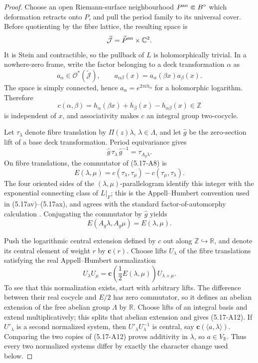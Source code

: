 \begin{proof}
Choose an open Riemann-surface neighbourhood \(P^{\rm an}\Subset B^\circ\)
which deformation retracts onto \(P\), and pull the period family to its
universal cover.  Before quotienting by the fibre lattice, the resulting
space is
\[
 \widetilde{\mathcal J}
 =\widetilde P^{\rm an}\times\mathbb C^2.
\]
It is Stein and contractible, so the pullback of \(L\) is holomorphically
trivial.  In a nowhere-zero frame, write the factor belonging to a deck
transformation \(\alpha\) as
\[
 a_\alpha\in\mathcal O^*(\widetilde{\mathcal J}),
 \qquad
 a_{\alpha\beta}(x)=a_\alpha(\beta x)a_\beta(x).
\tag{5.17-A7}
\]
The space is simply connected, hence \(a_\alpha=e^{2\pi i h_\alpha}\) for
a holomorphic logarithm.  Therefore
\[
 c(\alpha,\beta)
 =h_\alpha(\beta x)+h_\beta(x)-h_{\alpha\beta}(x)\in\mathbb Z
\tag{5.17-A8}
\]
is independent of \(x\), and associativity makes \(c\) an integral group
two-cocycle.

Let \(\tau_\lambda\) denote fibre translation by
\(\Pi(z)\lambda\), \(\lambda\in\Lambda\), and let \(\widehat g\) be the
zero-section lift of a base deck transformation.  Period equivariance gives
\[
 \widehat g\,\tau_\lambda\,\widehat g^{-1}
 =\tau_{A_g\lambda}.
\tag{5.17-A9}
\]
On fibre translations, the commutator of (5.17-A8) is
\[
 E(\lambda,\mu)
 =c(\tau_\lambda,\tau_\mu)-c(\tau_\mu,\tau_\lambda).
\tag{5.17-A10}
\]
The four oriented sides of the \((\lambda,\mu)\)-parallelogram identify
this integer with the exponential connecting class of \(L|_F\); this is
the Appell--Humbert convention used in
(5.17av)--(5.17ax), and agrees with the standard factor-of-automorphy
calculation \cite[Chapter~1, \S2, pp.~5--8, especially
Theorem~2.1, p.~7]{BirkenhakeLange1999}%
\cite[equations~(3.3)--(3.10), pp.~3--7]{SchnellLecture3}.
Conjugating the commutator by \(\widehat g\) yields
\[
 E(A_g\lambda,A_g\mu)=E(\lambda,\mu).
\tag{5.17-A11}
\]

Push the logarithmic central extension defined by \(c\) out along
\(\mathbb Z\hookrightarrow\mathbb R\), and denote its central element of
weight \(r\) by \(\mathbf c(r)\).  Choose lifts \(U_\lambda\) of the fibre
translations satisfying the real Appell--Humbert normalization
\[
 U_\lambda U_\mu
 =\mathbf c\!\left(\frac12E(\lambda,\mu)\right)U_{\lambda+\mu}.
\tag{5.17-A12}
\]
To see that this normalization exists, start with arbitrary lifts.  The
difference between their real cocycle and \(E/2\) has zero commutator, so
it defines an abelian extension of the free abelian group \(\Lambda\) by
\(\mathbb R\).  Choose lifts of an integral basis and extend
multiplicatively; this splits that abelian extension and gives (5.17-A12).
If \(U'_\lambda\) is a second normalized system, then
\(U'_\lambda U_\lambda^{-1}\) is central, say
\(\mathbf c(\langle a,\lambda\rangle)\).  Comparing the two copies of
(5.17-A12) proves additivity in \(\lambda\), so
\(a\in V_{\mathbb R}\).  Thus every two normalized systems differ by exactly
the character change used below.


\end{proof}

